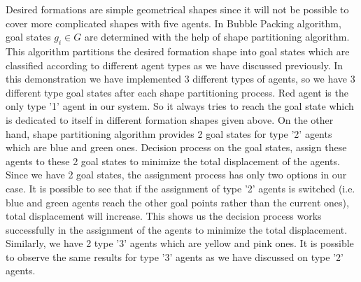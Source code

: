 Desired formations are simple geometrical shapes since it will not be possible to cover more complicated shapes with five agents. In Bubble Packing algorithm, goal states $g_i \in G$ are determined with the help of shape partitioning algorithm. This algorithm partitions the desired formation shape into goal states which are classified according to different agent types as we have discussed previously. In this demonstration we have implemented 3 different types of agents, so we have 3 different type goal states after each shape partitioning process. Red agent is the only type '1' agent in our system. So it always tries to reach the goal state which is dedicated to itself in different formation shapes given above. On the other hand, shape partitioning algorithm provides 2 goal states for type '2' agents which are blue and green ones. Decision process on the goal states, assign these agents to these 2 goal states to minimize the total displacement of the agents. Since we have 2 goal states, the assignment process has only two options in our case. It is possible to see that if the assignment of type '2' agents is switched (i.e. blue and green agents reach the other goal points rather than the current ones), total displacement will increase. This shows us the decision process works successfully in the assignment of the agents to minimize the total displacement. Similarly, we have 2 type '3' agents which are yellow and pink ones. It is possible to observe the same results for type '3' agents as we have discussed on type '2' agents.